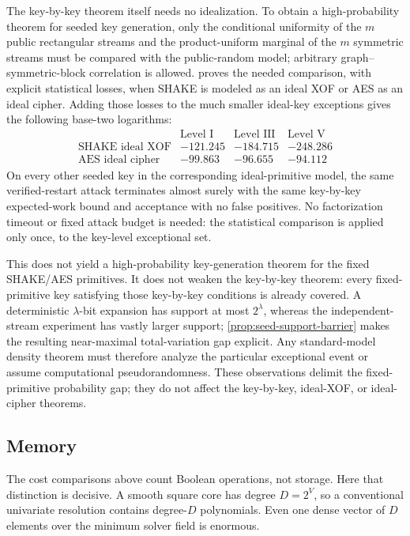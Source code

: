 \documentclass[11pt,a4paper]{article}
\theoremstyle{definition}
\theoremstyle{remark}
\begin{document}
The key-by-key theorem itself needs no idealization.  To obtain a high-probability theorem for seeded key generation, only the conditional uniformity of the $m$ public rectangular streams and the product-uniform marginal of the $m$ symmetric streams must be compared with the public-random model; arbitrary graph--symmetric-block correlation is allowed.   proves the needed comparison, with explicit statistical losses, when SHAKE is modeled as an ideal XOF or AES as an ideal cipher.  Adding those losses to the much smaller ideal-key exceptions gives the following base-two logarithms:
\[
\begin{array}{c|rrr}
&\text{Level I}&\text{Level III}&\text{Level V}\\ \hline
\text{SHAKE ideal XOF}&-121.245&-184.715&-248.286\\
\text{AES ideal cipher}&-99.863&-96.655&-94.112
\end{array}
\]
On every other seeded key in the corresponding ideal-primitive model, the same verified-restart attack terminates almost surely with the same key-by-key expected-work bound and acceptance with no false positives.  No factorization timeout or fixed attack budget is needed: the statistical comparison is applied only once, to the key-level exceptional set.

This does not yield a high-probability key-generation theorem for the fixed SHAKE/AES primitives.  It does not weaken the key-by-key theorem: every fixed-primitive key satisfying those key-by-key conditions is already covered.  A deterministic $\lambda$-bit expansion has support at most $2^\lambda$, whereas the independent-stream experiment has vastly larger support; \cref{prop:seed-support-barrier} makes the resulting near-maximal total-variation gap explicit.  Any standard-model density theorem must therefore analyze the particular exceptional event or assume computational pseudorandomness.  These observations delimit the fixed-primitive probability gap; they do not affect the key-by-key, ideal-XOF, or ideal-cipher theorems.

\subsection{Memory}\label{subsec:memory}

The cost comparisons above count Boolean operations, not storage.  Here that distinction is decisive.  A smooth square core has degree $D=2^V$, so a conventional univariate resolution contains degree-$D$ polynomials.  Even one dense vector of $D$ elements over the minimum solver field is enormous.
\end{document}
